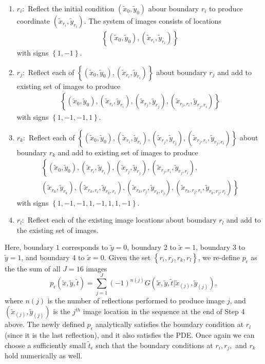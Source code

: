 \begin{enumerate}
\item $r_i:$ Reflect the initial condition
  $(\tilde{x}_0, \tilde{y}_0)$ abour boundary $r_i$ to produce
  coordinate $(\tilde{x}_{r_i}, \tilde{y}_{r_i})$. The system of
  images consists of locations
  \begin{align*}
    \left\{(\tilde{x}_0, \tilde{y}_0), (\tilde{x}_{r_i},
  \tilde{y}_{r_i})\right\}
  \end{align*}
  with signs $\left\{1, -1\right\}$.
\item $r_j:$ Reflect each of $\left\{(\tilde{x}_0, \tilde{y}_0), (\tilde{x}_{r_i},
  \tilde{y}_{r_i})\right\}$ about boundary $r_j$ and add to existing set of images to produce
  \begin{align*}
    \left\{ (\tilde{x}_0, \tilde{y}_0), (\tilde{x}_{r_i},
    \tilde{y}_{r_i}), (\tilde{x}_{r_j}, \tilde{y}_{r_j}), (\tilde{x}_{r_j, r_i},
    \tilde{y}_{r_j, r_i}) \right\}
  \end{align*}
  with signs $\left\{1,-1,-1,1\right\}$.

\item $r_k:$ Reflect each of $\left\{ (\tilde{x}_0, \tilde{y}_0), (\tilde{x}_{r_i},
    \tilde{y}_{r_i}), (\tilde{x}_{r_j}, \tilde{y}_{r_j}), (\tilde{x}_{r_j, r_i},
    \tilde{y}_{r_j, r_i}) \right\}$ about boundary $r_k$ and add to existing set of images to produce
  \begin{align*}
    & \left\{ (\tilde{x}_0, \tilde{y}_0), (\tilde{x}_{r_i},
    \tilde{y}_{r_i}), (\tilde{x}_{r_j}, \tilde{y}_{r_j}), (\tilde{x}_{r_j, r_i},
    \tilde{y}_{r_j, r_i}), \right. & \\
    & \left. (\tilde{x}_{r_k}, \tilde{y}_{r_k}), (\tilde{x}_{r_k, r_i},
    \tilde{y}_{r_k, r_i}), (\tilde{x}_{r_k, r_j}, \tilde{y}_{r_k, r_j}), (\tilde{x}_{r_k, r_j, r_i},
    \tilde{y}_{r_k, r_j, r_i})  \right\}&
  \end{align*}
  with signs $\left\{1,-1,-1,1, -1,1,1,-1\right\}$.
\item $r_l:$ Reflect each of the existing image locations about
  boundary $r_l$ and add to the existing set of images.
\end{enumerate}
Here, boundary $1$ corresponds to $\tilde{y}=0$, boundary 2 to
$\tilde{x}=1$, boundary 3 to $\tilde{y}=1$, and boundary 4 to
$\tilde{x} = 0$.  Given the set $\left\{r_i,r_j,r_k,r_l\right\}$, we
re-define $p_\epsilon$ as the the sum of all $J = 16$ images
\begin{equation*}
  p_\epsilon(\tilde{x}, \tilde{y}, \tilde{t}) = \sum_{j=1}^J (-1)^{n(j)}
  G(\tilde{x},\tilde{y},\tilde{t}|\tilde{x}_{(j)},\tilde{y}_{(j)}),
\end{equation*}
where $n(j)$ is the number of reflections performed to produce image
$j$, and $(\tilde{x}_{(j)},\tilde{y}_{(j)})$ is the $j^{th}$ image
location in the sequence at the end of Step 4 above. The newly defined
$p_\epsilon$ analytically satisfies the boundary condition at $r_l$
(since it is the last reflection), and it also satisfies the PDE. Once
again we can choose a sufficiently small $\tilde{t}_\epsilon$ such
that the boundary conditions at $r_i, r_j,$ and $r_k$ hold numerically
as well.

